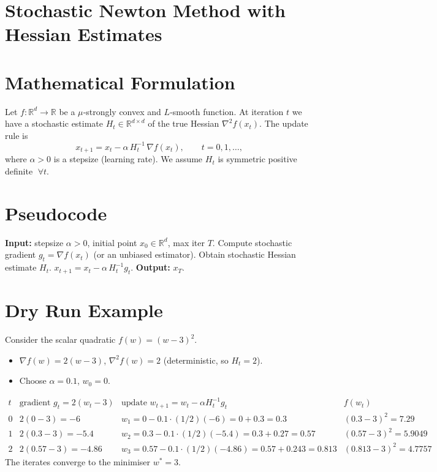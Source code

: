 \documentclass{article}
\begin{document}
\section*{Stochastic Newton Method with Hessian Estimates}

\section*{Mathematical Formulation}
Let $f:\mathbb{R}^{d}\rightarrow\mathbb{R}$ be a $\mu$‑strongly convex and $L$‑smooth function.  
At iteration $t$ we have a stochastic estimate $H_{t}\in\mathbb{R}^{d\times d}$ of the true Hessian $\nabla^{2}f(x_{t})$.
The update rule is
\[
x_{t+1}=x_{t}-\alpha\, H_{t}^{-1}\,\nabla f(x_{t}),\qquad t=0,1,\dots,
\tag{1}
\]
where $\alpha>0$ is a stepsize (learning rate).  
We assume $H_{t}$ is symmetric positive definite $\; \forall t$.

\section*{Pseudocode}
\begin{algorithm}[H]
\caption{Stochastic Newton with Hessian Estimates}
\begin{algorithmic}[1]
\STATE \textbf{Input:} stepsize $\alpha>0$, initial point $x_{0}\in\mathbb{R}^{d}$, max iter $T$.
    \STATE Compute stochastic gradient $g_{t}=\nabla f(x_{t})$ (or an unbiased estimator).
    \STATE Obtain stochastic Hessian estimate $H_{t}$.
    \STATE $x_{t+1}=x_{t}-\alpha\, H_{t}^{-1}g_{t}$.
\ENDFOR
\STATE \textbf{Output:} $x_{T}$.
\end{algorithmic}
\end{algorithm}

\section*{Dry Run Example}
Consider the scalar quadratic $f(w)=(w-3)^{2}$.
\begin{itemize}
    \item $\nabla f(w)=2(w-3)$, $\nabla^{2}f(w)=2$ (deterministic, so $H_{t}=2$).
    \item Choose $\alpha=0.1$, $w_{0}=0$.
\end{itemize}
\[
\begin{array}{c|c|c|c}
t & \text{gradient }g_{t}=2(w_{t}-3) & \text{update }w_{t+1}=w_{t}-\alpha H_{t}^{-1}g_{t} & f(w_{t})\\ \hline
0 & 2(0-3)=-6 & w_{1}=0-0.1\cdot(1/2)(-6)=0+0.3=0.3 & (0.3-3)^{2}=7.29\\
1 & 2(0.3-3)=-5.4 & w_{2}=0.3-0.1\cdot(1/2)(-5.4)=0.3+0.27=0.57 & (0.57-3)^{2}=5.9049\\
2 & 2(0.57-3)=-4.86 & w_{3}=0.57-0.1\cdot(1/2)(-4.86)=0.57+0.243=0.813 & (0.813-3)^{2}=4.7757
\end{array}
\]
The iterates converge to the minimiser $w^{*}=3$.
\end{document}
